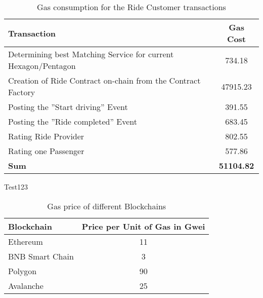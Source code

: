 \begin{table}[h]
\centering
\begin{tabular}{|l|c|}
\hline
\textbf{Transaction} & \textbf{Gas Cost} \\
\hline
Determining best Matching Service for current Hexagon/Pentagon & 734.18 \\
\hline
Creation of Ride Contract on-chain from the Contract Factory& 47915.23 \\
\hline
Posting the ''Start driving'' Event& 391.55 \\
\hline
Posting the ''Ride completed'' Event & 683.45 \\
\hline
Rating Ride Provider & 802.55 \\
\hline
Rating one Passenger & 577.86 \\
\hline
\hline
\textbf{Sum}  & \textbf{51104.82} \\
\hline
\end{tabular}
\caption{Gas consumption for the Ride Customer transactions}
\end{table}

Test123

\begin{table}
\centering
\begin{tabular}{|l|c|}
\hline
\textbf{Blockchain} & \textbf{Price per Unit of Gas in Gwei}\\
\hline
Ethereum & 11 \\
\hline
BNB Smart Chain & 3 \\
\hline
Polygon & 90 \\
\hline
Avalanche & 25 \\
\hline
\end{tabular}
\caption{Gas price of different Blockchains}
\end{table}
